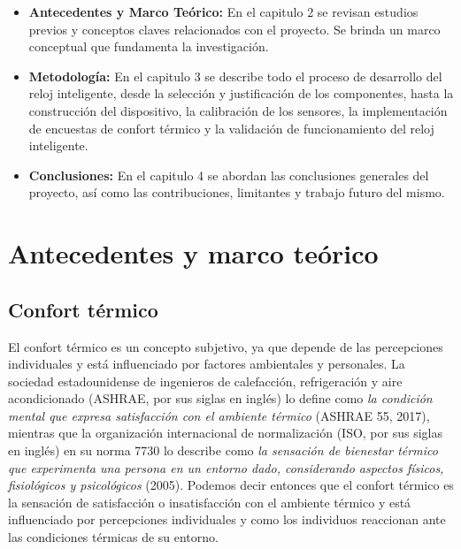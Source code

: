 \documentclass[
  12pt,
  letterpaper,
  DIV=11,
  numbers=noendperiod]{scrreport}
\begin{document}
\begin{itemize}
\item
  \textbf{Antecedentes y Marco Teórico:} En el capitulo 2 se revisan
  estudios previos y conceptos claves relacionados con el proyecto. Se
  brinda un marco conceptual que fundamenta la investigación.
\item
  \textbf{Metodología:} En el capitulo 3 se describe todo el proceso de
  desarrollo del reloj inteligente, desde la selección y justificación
  de los componentes, hasta la construcción del dispositivo, la
  calibración de los sensores, la implementación de encuestas de confort
  térmico y la validación de funcionamiento del reloj inteligente.
\item
  \textbf{Conclusiones:} En el capitulo 4 se abordan las conclusiones
  generales del proyecto, así como las contribuciones, limitantes y
  trabajo futuro del mismo.
\end{itemize}


\hypertarget{antecedentes-y-marco-teuxf3rico}{%
\chapter{Antecedentes y marco
teórico}\label{antecedentes-y-marco-teuxf3rico}}

\hypertarget{confort-tuxe9rmico}{%
\section{Confort térmico}\label{confort-tuxe9rmico}}

El confort térmico es un concepto subjetivo, ya que depende de las
percepciones individuales y está influenciado por factores ambientales y
personales. La sociedad estadounidense de ingenieros de calefacción,
refrigeración y aire acondicionado (ASHRAE, por sus siglas en inglés) lo
define como \emph{la condición mental que expresa satisfacción con el
ambiente térmico} (ASHRAE 55, 2017), mientras que la organización
internacional de normalización (ISO, por sus siglas en inglés) en su
norma 7730 lo describe como \emph{la sensación de bienestar térmico que
experimenta una persona en un entorno dado, considerando aspectos
físicos, fisiológicos y psicológicos} (2005). Podemos decir entonces que
el confort térmico es la sensación de satisfacción o insatisfacción con
el ambiente térmico y está influenciado por percepciones individuales y
como los individuos reaccionan ante las condiciones térmicas de su
entorno.
\end{document}
